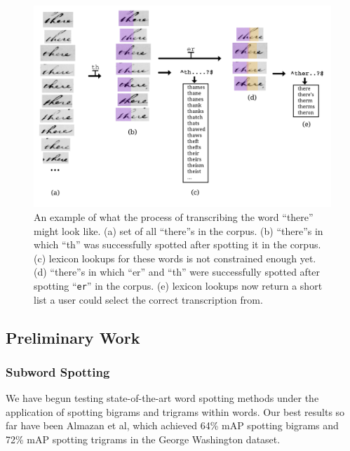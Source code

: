 \documentclass[ms]{byuprop}
\begin{document}
\begin{figure}
    \centering
    \includegraphics[width=.75\textwidth]{flow_ex}
    \caption{An example of what the process of transcribing the word ``there'' might look like. (a) set of all ``there''s in the corpus. (b) ``there''s in which ``th'' was successfully spotted after spotting it in the corpus. (c) lexicon lookups for these words is not constrained enough yet. (d) ``there''s in which ``er'' and ``th'' were successfully spotted after spotting ``\texttt{er}'' in the corpus. (e) lexicon lookups now return a short list a user could select the correct transcription from.}
    \label{fig:flow_ex}
\end{figure}


\subsection{Preliminary Work}

\subsubsection{Subword Spotting}
We have begun testing state-of-the-art word spotting methods under the application of spotting bigrams and trigrams within words. Our best results so far have been Almazan et al\cite{Almazan2014}, which achieved 64\% mAP spotting bigrams and 72\% mAP spotting trigrams in the George Washington dataset.
\end{document}

